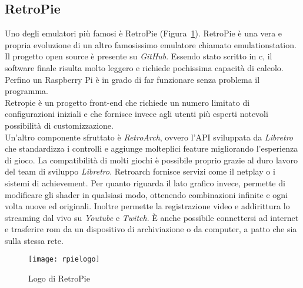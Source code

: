 \subsection{RetroPie}
Uno degli emulatori più famosi è RetroPie (Figura~\ref{fig:rpie}). RetroPie è una vera e propria evoluzione di un altro famosissimo emulatore chiamato emulationstation. Il progetto open source è presente su \textit{GitHub}. Essendo stato scritto in \gls{c}, il software finale risulta molto leggero e richiede pochissima capacità di calcolo. Perfino un Raspberry Pi è in grado di far funzionare senza problema il programma.\\Retropie è un progetto front-end che richiede un numero limitato di configurazioni iniziali e che fornisce invece agli utenti più esperti notevoli possibilità di customizzazione.\\Un’altro componente sfruttato è \textit{RetroArch}, ovvero l’API sviluppata da \textit{Libretro} che standardizza i controlli e aggiunge molteplici feature migliorando l’esperienza di gioco. La compatibilità di molti giochi è possibile proprio grazie al duro lavoro del team di sviluppo \textit{Libretro}. Retroarch fornisce servizi come il netplay o i sistemi di achievement. Per quanto riguarda il lato grafico invece, permette di modificare gli shader in qualsiasi modo, ottenendo combinazioni infinite e ogni volta nuove ed originali. Inoltre permette la registrazione video e addirittura lo streaming dal vivo su \textit{Youtube} e \textit{Twitch}. È anche possibile connettersi ad internet e trasferire rom da un dispositivo di archiviazione o da computer, a patto che sia sulla stessa rete.\\
\begin{figure}[!ht]
\texttt{[image: rpielogo]}
\centering
\caption{Logo di RetroPie}
\label{fig:rpie}
\end{figure}
